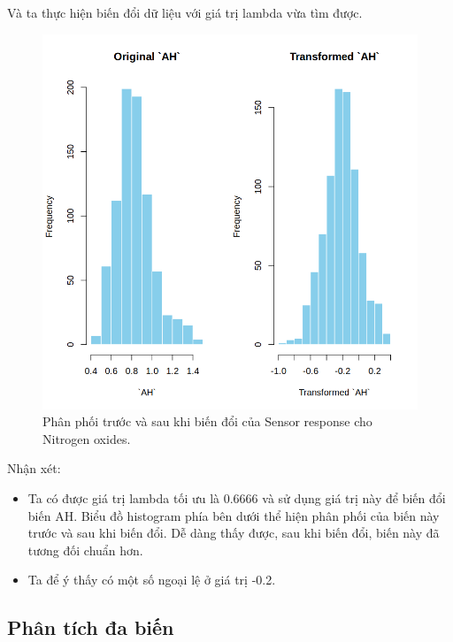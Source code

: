 Và ta thực hiện biến đổi dữ liệu với giá trị lambda vừa tìm được.
\begin{figure}[H]
    \centering
    \includegraphics[width=0.75\columnwidth]{air_figures/AH_transformed_distribution.png}
    \caption{Phân phối trước và sau khi biến đổi của Sensor response cho Nitrogen oxides.}
    \label{fig:ah_transformed_distribution}
\end{figure}
Nhận xét:
\begin{itemize}
    \item Ta có được giá trị lambda tối ưu là 0.6666 và sử dụng giá trị này để biến đổi biến AH. Biểu đồ histogram phía bên dưới thể hiện phân phối của biến này trước và sau khi biến đổi. Dễ dàng thấy được, sau khi biến đổi, biến này đã tương đối chuẩn hơn.
    \item Ta để ý thấy có một số ngoại lệ ở giá trị -0.2.
\end{itemize}

\subsection{Phân tích đa biến}

